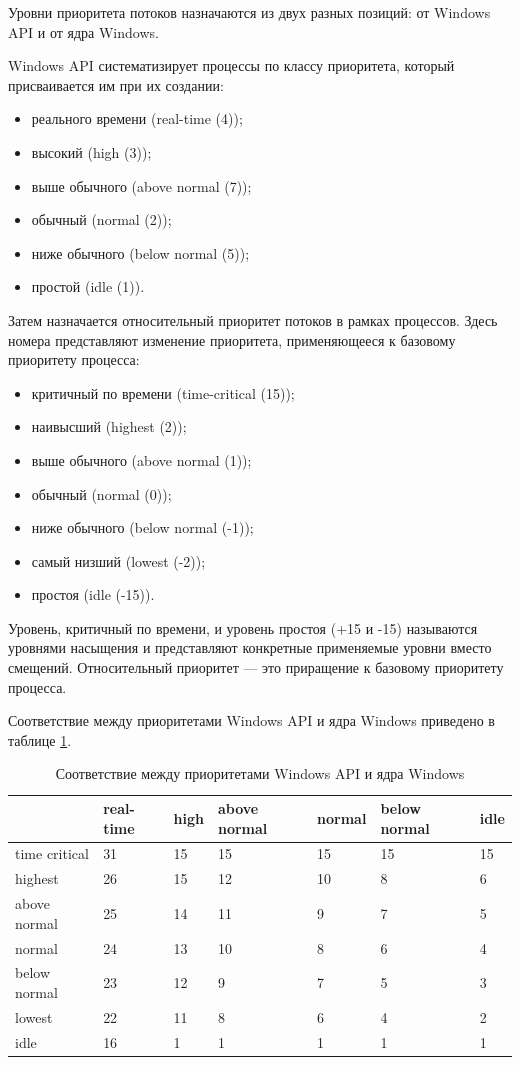 \documentclass[a4paper,oneside,14pt]{extarticle}
\begin{document}
Уровни приоритета потоков назначаются из двух разных позиций: от Windows API и от ядра Windows.

Windows API систематизирует процессы по классу приоритета, который присваивается им при их создании:
\begin{itemize}
	\item реального времени (real-time (4));
	\item высокий (high (3));
	\item выше обычного (above normal (7));
	\item обычный (normal (2));
	\item ниже обычного (below normal (5));
	\item простой (idle (1)).
\end{itemize}

Затем назначается относительный приоритет потоков в рамках процессов.
Здесь номера представляют изменение приоритета, применяющееся к базовому приоритету процесса:
\begin{itemize}
	\item критичный по времени (time-critical (15));
	\item наивысший (highest (2));
	\item выше обычного (above normal (1));
	\item обычный (normal (0));
	\item ниже обычного (below normal (-1));
	\item самый низший (lowest (-2));
	\item простоя (idle (-15)).
\end{itemize}

Уровень, критичный по времени, и уровень простоя (+15 и -15) называются уровнями насыщения и представляют конкретные применяемые уровни вместо смещений.
Относительный приоритет --- это приращение к базовому приоритету процесса.

Соответствие между приоритетами Windows API и ядра Windows приведено в таблице \ref{tbl:priority}.
\begin{table}[h]
    \caption{Соответствие между приоритетами Windows API и ядра Windows}
	\begin{center}
		\begin{tabular}{|l|p{45pt}|p{45pt}|p{45pt}|p{45pt}|p{45pt}|p{45pt}|} 
			\hline
			{} & {real-time} & {high} & {above normal} & {normal} & {below normal} & {idle}\\
			\hline
			{time critical} & 31 & 15 & 15 & 15 & 15 & 15 \\
			\hline
			{highest} & 26 & 15 & 12 & 10 & 8 & 6 \\
			\hline
			{above normal} & 25 & 14 & 11 & 9 & 7 & 5 \\
			\hline
			{normal} & 24 & 13 & 10 & 8 & 6 & 4 \\
			\hline
			{below normal} & 23 & 12 & 9 & 7 & 5 & 3 \\
			\hline
			{lowest} & 22 & 11 & 8 & 6 & 4 & 2 \\
			\hline
			{idle} & 16 & 1 & 1 & 1 & 1 & 1 \\
			\hline
		\end{tabular}
	\end{center}
	\label{tbl:priority}
\end{table}
\end{document}
